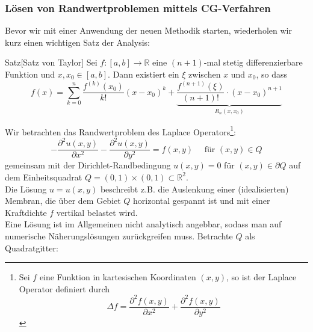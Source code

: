     \subsubsection{Lösen von Randwertproblemen mittels CG-Verfahren}
    Bevor wir mit einer Anwendung der neuen Methodik starten, wiederholen wir kurz einen wichtigen Satz der Analysis:
    \begin{thmbox}{Satz}[Satz von Taylor]
        Sei $f:[a,b]\rightarrow \mathbb{R}$ eine $(n+1)$-mal stetig differenzierbare Funktion und $x,x_0\in[a,b]$. 
        Dann existiert ein $\xi$ zwischen $x$ und $x_0$, so dass
        \[f(x) = \sum_{k=0}^{n}\dfrac{f^{(k)}(x_0)}{k!}(x-x_0)^k + 
        \underbrace{\dfrac{f^{(n+1)}(\xi)}{(n+1)!}\cdot(x-x_0)^{n+1}}_{R_n(x,x_0)}\]
    \end{thmbox}
    \begin{egbox}
        Wir betrachten das Randwertproblem des Laplace Operators\footnote{
            Sei $f$ eine Funktion in kartesischen Koordinaten $(x,y)$, so ist der Laplace Operator definiert durch 
            \[\Delta f = \dfrac{\partial^2 f(x,y)}{\partial x^2} + \dfrac{\partial^2 f(x,y)}{\partial y^2}\]
            }:
        \[-\dfrac{\partial^2 u(x,y)}{\partial x^2} - \dfrac{\partial^2 u(x,y)}{\partial y^2} = f(x,y) \quad 
        \text{ für } (x,y)\in Q\]
        gemeinsam mit der Dirichlet-Randbedingung $u(x,y)=0$ für $(x,y)\in \partial Q$ auf dem Einheitsquadrat 
        $Q=(0,1)\times(0,1)\subset\mathbb{R}^2$. \\
        Die Lösung $u=u(x,y)$ beschreibt z.B. die Auslenkung einer (idealisierten) Membran, die über dem Gebiet $Q$ 
        horizontal gespannt ist und mit einer Kraftdichte $f$ vertikal belastet wird. \\
        Eine Lösung ist im Allgemeinen nicht analytisch angebbar, sodass man auf numerische Näherungslösungen 
        zurückgreifen muss.
        Betrachte $Q$ als Quadratgitter: 
        \begin{center}
\end{center}
\end{egbox}
